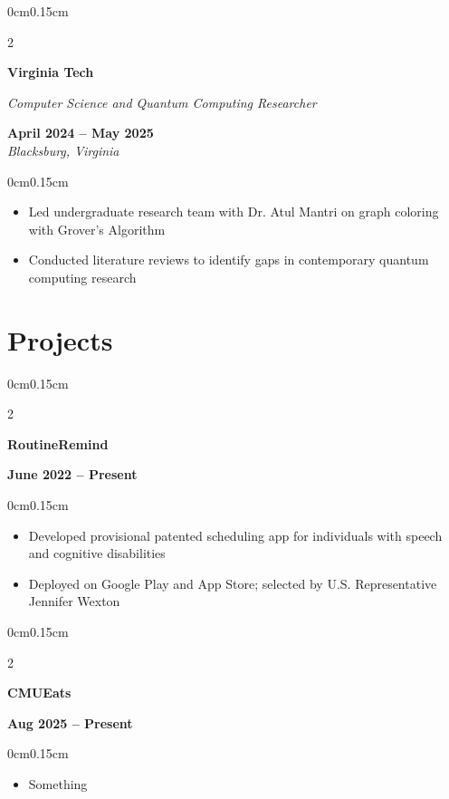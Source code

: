 \documentclass[10pt, letterpaper]{article}
\newenvironment{highlights}{
    \begin{itemize}[topsep=0pt, parsep=0pt, partopsep=0pt, itemsep=0pt, leftmargin=0.6cm]
}{
    \end{itemize}
}
\newenvironment{onecolentry}{
    \begin{adjustwidth}{0cm}{0.15cm}
}{
    \end{adjustwidth}
}
\newenvironment{twocolentry}[2][]{
    \onecolentry
    \def\secondColumn{#2}
    \setcolumnwidth{\fill, 4cm}
    \begin{paracol}{2}
}{
    \switchcolumn \raggedleft \secondColumn
    \end{paracol}
    \endonecolentry
}
\begin{document}
    \vspace{0.05cm}
    \begin{twocolentry}{\textbf{April 2024 -- May 2025} \\ \textit{Blacksburg, Virginia}}
        \textbf{Virginia Tech}
        
        \textit{Computer Science and Quantum Computing Researcher}
    \end{twocolentry}

    \begin{onecolentry}
        \begin{highlights}
            \item Led undergraduate research team with Dr. Atul Mantri on graph coloring with Grover's Algorithm
            \item Conducted literature reviews to identify gaps in contemporary quantum computing research
        \end{highlights}
    \end{onecolentry}

    \vspace{0.05cm}
    \section{Projects}
    \vspace{0.1cm}

    \begin{twocolentry}{\textbf{June 2022 -- Present}}
        \textbf{RoutineRemind}
    \end{twocolentry}

    \begin{onecolentry}
        \begin{highlights}
            \item Developed provisional patented scheduling app for individuals with speech and cognitive disabilities
            \item Deployed on Google Play and App Store; selected by U.S. Representative Jennifer Wexton
        \end{highlights}
    \end{onecolentry}

    \vspace{0.05cm}

    \begin{twocolentry}{\textbf{Aug 2025 -- Present}}
        \textbf{CMUEats}
    \end{twocolentry}

    \begin{onecolentry}
        \begin{highlights}
            \item Something
        \end{highlights}
    \end{onecolentry}
\end{document}
